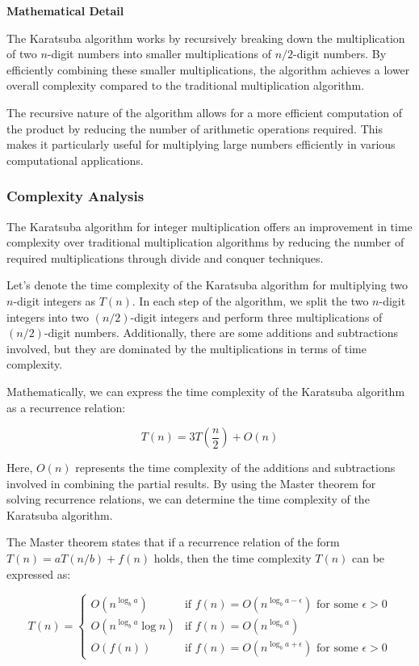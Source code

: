 \documentclass[12pt]{book} %
\begin{document}
\textbf{Mathematical Detail}

The Karatsuba algorithm works by recursively breaking down the multiplication of two \(n\)-digit numbers into smaller multiplications of \(n/2\)-digit numbers. By efficiently combining these smaller multiplications, the algorithm achieves a lower overall complexity compared to the traditional multiplication algorithm.

The recursive nature of the algorithm allows for a more efficient computation of the product by reducing the number of arithmetic operations required. This makes it particularly useful for multiplying large numbers efficiently in various computational applications.

\subsubsection{Complexity Analysis}
The Karatsuba algorithm for integer multiplication offers an improvement in time complexity over traditional multiplication algorithms by reducing the number of required multiplications through divide and conquer techniques.

Let's denote the time complexity of the Karatsuba algorithm for multiplying two \(n\)-digit integers as \(T(n)\). In each step of the algorithm, we split the two \(n\)-digit integers into two \((n/2)\)-digit integers and perform three multiplications of \((n/2)\)-digit numbers. Additionally, there are some additions and subtractions involved, but they are dominated by the multiplications in terms of time complexity.

Mathematically, we can express the time complexity of the Karatsuba algorithm as a recurrence relation:

\[
T(n) = 3T\left(\frac{n}{2}\right) + O(n)
\]

Here, \(O(n)\) represents the time complexity of the additions and subtractions involved in combining the partial results. By using the Master theorem for solving recurrence relations, we can determine the time complexity of the Karatsuba algorithm.

The Master theorem states that if a recurrence relation of the form \(T(n) = aT(n/b) + f(n)\) holds, then the time complexity \(T(n)\) can be expressed as:

\[
T(n) = \begin{cases}
O(n^{\log_b a}) & \text{if } f(n) = O(n^{\log_b a - \epsilon}) \text{ for some } \epsilon > 0 \\
O(n^{\log_b a} \log n) & \text{if } f(n) = O(n^{\log_b a}) \\
O(f(n)) & \text{if } f(n) = O(n^{\log_b a + \epsilon}) \text{ for some } \epsilon > 0
\end{cases}
\]
\end{document}
